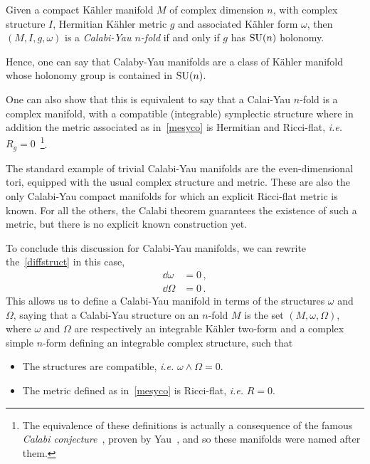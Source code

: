 \documentclass[debug]{phd}
\begin{document}
									Given a compact K\"ahler manifold $M$ of complex dimension $n$, with complex structure $I$, Hermitian K\"ahler metric $g$ and associated K\"ahler form $\omega$, then $(M, I, g, \omega)$ is a \emph{Calabi-Yau $n$-fold} if and only if $g$ has $\mathrm{SU}(n)$ holonomy.
									
					Hence, one can say that Calaby-Yau manifolds are a class of K\"ahler manifold whose holonomy group is contained in $\mathrm{SU}(n)$.
					
					One can also show that this is equivalent to say that a Calai-Yau $n$-fold is a complex manifold, with a compatible (integrable) symplectic structure where in addition the metric associated as in~\eqref{mesyco} is Hermitian and Ricci-flat, \emph{i.e.} $R_g = 0$~\cite{joyce, KahlBook}\footnote{%
						The equivalence of these definitions is actually a consequence of the famous \emph{Calabi conjecture}~\cite{CalabiMetr}, proven by Yau~\cite{YauCalabi}, and so these manifolds were named after them.}.
						
					The standard example of trivial Calabi-Yau manifolds are the even-dimensional tori, equipped with the usual complex structure and metric.
					These are also the only Calabi-Yau compact manifolds for which an explicit Ricci-flat metric is known.
					For all the others, the Calabi theorem guarantees the existence of such a metric, but there is no explicit known construction yet.
					
					To conclude this discussion for Calabi-Yau manifolds, we can rewrite the~\eqref{diffstruct} in this case,
							\begin{align*}
								\dd \omega 	&= 0 \, , \\
								\dd \Omega	&= 0 \, .
							\end{align*}
					This allows us to define a Calabi-Yau manifold in terms of the structures $\omega$ and $\Omega$, saying that a Calabi-Yau structure on an $n$-fold $M$ is the set $(M, \omega, \Omega)$, where $\omega$ and $\Omega$ are respectively an integrable K\"ahler two-form and a complex simple $n$-form defining an integrable complex structure, such that
							\begin{itemize}
							\item [] The structures are compatible, \emph{i.e.} $\omega \wedge \Omega = 0$.
							\item [] The metric defined as in~\eqref{mesyco} is Ricci-flat, \emph{i.e.} $R = 0$.
							\end{itemize}
\end{document}
